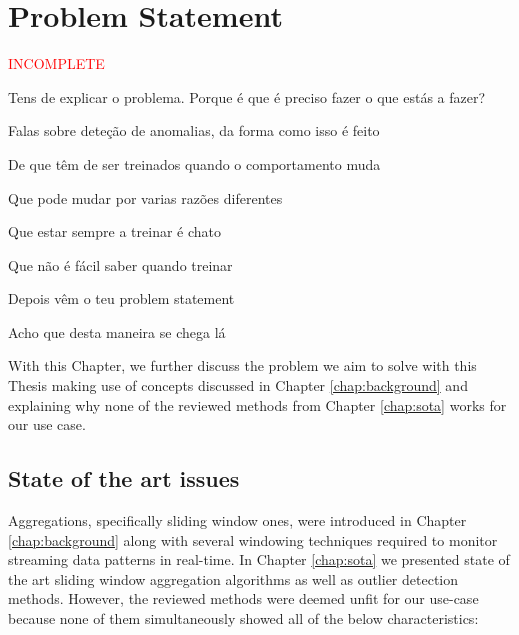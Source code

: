 \chapter{Problem Statement} \label{chap:statement} \minitoc

\textcolor{red}{INCOMPLETE}

Tens de explicar o problema. Porque é que é preciso fazer o que estás a fazer?



Falas sobre deteção de anomalias, da forma como isso é feito



De que têm de ser treinados quando o comportamento muda



Que pode mudar por varias razões diferentes



Que estar sempre a treinar é chato



Que não é fácil saber quando treinar



Depois vêm o teu problem statement



Acho que desta maneira se chega lá





With this Chapter, we further discuss the problem we aim to solve with this Thesis making use of concepts discussed in Chapter \ref{chap:background} and explaining why none of the reviewed methods from Chapter \ref{chap:sota} works for our use case.

\section{State of the art issues}
Aggregations, specifically sliding window ones, were introduced in Chapter \ref{chap:background} along with several windowing techniques required to monitor streaming data patterns in real-time. In Chapter \ref{chap:sota} we presented state of the art sliding window aggregation algorithms as well as outlier detection methods. However, the reviewed methods were deemed unfit for our use-case because none of them simultaneously showed all of the below characteristics:


